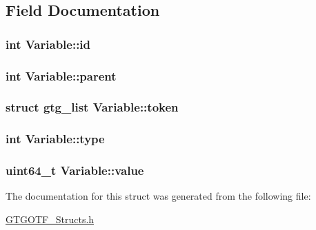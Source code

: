 \subsection{Field Documentation}
\hypertarget{structVariable_a8d689afc1cb0df2adc60fbfdc9cbae34}{
\subsubsection[{id}]{\setlength{\rightskip}{0pt plus 5cm}int Variable\-::id}}\label{structVariable_a8d689afc1cb0df2adc60fbfdc9cbae34}
\hypertarget{structVariable_a3cb36d32e3d836c934ffdcb8e6b2548c}{
\subsubsection[{parent}]{\setlength{\rightskip}{0pt plus 5cm}int Variable\-::parent}}\label{structVariable_a3cb36d32e3d836c934ffdcb8e6b2548c}
\hypertarget{structVariable_a0bc63e6674147c2277c89b3381eeaa91}{
\subsubsection[{token}]{\setlength{\rightskip}{0pt plus 5cm}struct {\bf gtg\-\_\-list} Variable\-::token}}\label{structVariable_a0bc63e6674147c2277c89b3381eeaa91}
\hypertarget{structVariable_a659e966bd442dbde52df805e15005bf9}{
\subsubsection[{type}]{\setlength{\rightskip}{0pt plus 5cm}int Variable\-::type}}\label{structVariable_a659e966bd442dbde52df805e15005bf9}
\hypertarget{structVariable_a7e8220b03f0a1eb35030f642eb8c4fb8}{
\subsubsection[{value}]{\setlength{\rightskip}{0pt plus 5cm}uint64\-\_\-t Variable\-::value}}\label{structVariable_a7e8220b03f0a1eb35030f642eb8c4fb8}


The documentation for this struct was generated from the following file\-:\begin{DoxyCompactItemize}
\item 
\hyperlink{GTGOTF__Structs_8h}{G\-T\-G\-O\-T\-F\-\_\-\-Structs.\-h}\end{DoxyCompactItemize}
